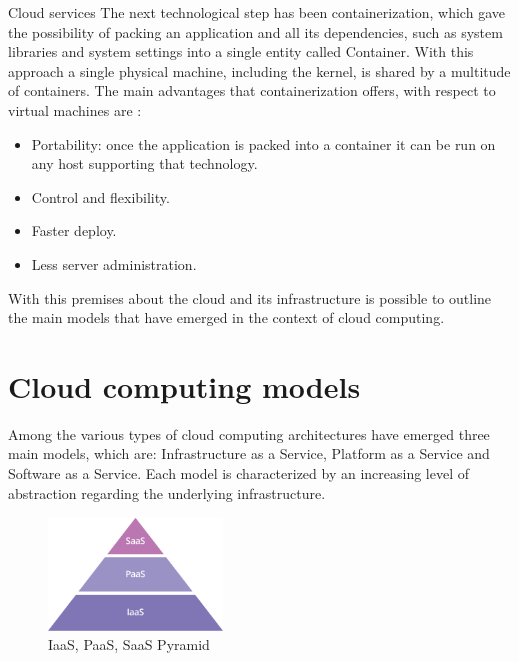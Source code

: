 \begin{chapter}{Cloud services}
    The next technological step has been containerization, which gave the possibility
    of packing an application and all its dependencies, such as system libraries
    and system settings into a single entity called Container. With this approach
    a single physical machine, including the kernel, is shared by a multitude of
    containers. The main advantages that containerization offers, with respect to
    virtual machines are \cite{what_is_the_cloud}:
    \begin{itemize}
        \item Portability: once the application is packed into a container it can
            be run on any host supporting that technology.
        \item Control and flexibility.
        \item Faster deploy.
        \item Less server administration.
    \end{itemize}
    With this premises about the cloud and its infrastructure is possible to outline
    the main models that have emerged in the context of cloud computing.

    \section{Cloud computing models}
    Among the various types of cloud computing architectures have emerged three
    main models, which are: Infrastructure as a Service, Platform as a Service and
    Software as a Service. Each model is characterized by an increasing level of
    abstraction regarding the underlying infrastructure.

    \begin{figure}
        \centering
        \includegraphics[height=3cm]{source/images/saas-paas-iaas-cloud-pyramid.png}
        \caption{IaaS, PaaS, SaaS Pyramid}
        \label{fig:cloud_computing_pyramid}
    \end{figure}


\end{chapter}

